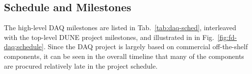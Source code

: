 


\subsection{Schedule and Milestones}
\label{sec:fd-daq:schedule}

The high-level DAQ milestones are listed in Tab.~\ref{tab:daq-sched}, interleaved with the top-level DUNE project milestones, and illustrated in in Fig.~\ref{fig:fd-daq:schedule}. Since the DAQ project is largely based on commercial off-the-shelf components, it can be seen in the overall timeline that many of the components are procured relatively late in the project schedule.

